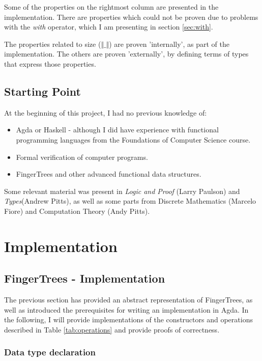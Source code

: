 \documentclass[12pt,twoside,notitlepage]{report}
\begin{document}
Some of the properties on the rightmost column are  presented in the implementation. There are properties which could not be proven due to problems with the \textit{with} operator, which I am presenting in section \ref{sec:with}.

The properties related to size ($\Vert\_\Vert$) are proven 'internally', as part of the implementation. The others are proven 'externally', by defining terms of types that express those properties. 

\section{Starting Point}

At the beginning of this project, I had no previous knowledge of:
\begin{itemize}
 \item Agda or Haskell - although I did have experience with functional programming languages from the Foundations of Computer Science course.
 \item Formal verification of computer programs.
 \item FingerTrees and other advanced functional data structures.
\end{itemize}

Some relevant material was present in \textit{Logic and Proof} (Larry Paulson) and \textit{Types}(Andrew Pitts), as well as some parts from Discrete Mathematics (Marcelo Fiore) and Computation Theory (Andy Pitts). 

\chapter{Implementation}

\section{FingerTrees - Implementation}

The previous section has provided an abstract representation of FingerTrees, as well as introduced the prerequisites for writing an implementation in Agda. In the following, I will provide implementations of the constructors and operations described in Table \ref{tab:operations} and provide proofs of correctness. 

\subsection{Data type declaration}
\end{document}
